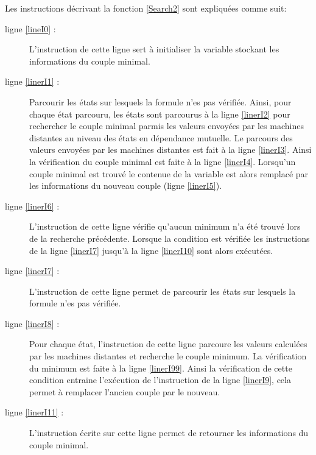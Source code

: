 Les instructions décrivant la fonction \ref{Search2} sont expliquées comme suit:
\begin{description}
	\item[ligne \ref{lineI0} :] L'instruction de cette ligne sert à initialiser la variable stockant les informations du couple minimal.
	\item[ligne \ref{linerI1} :] Parcourir les états \s{\border{}} sur lesquels la formule n'es pas vérifiée. Ainsi, pour chaque état parcouru, les états \s{\notifier} sont parcourus à la ligne \ref{linerI2} pour rechercher le couple minimal parmis les valeurs envoyées par les machines distantes au niveau des états en dépendance mutuelle. Le parcours des valeurs envoyées par les machines distantes est fait à la ligne \ref{linerI3}. Ainsi la vérification du couple minimal est faite  à la ligne \ref{linerI4}. Lorsqu'un couple minimal est trouvé le contenue de la variable  est alors remplacé par les informations du nouveau couple (ligne \ref{linerI5}).
	\item[ligne \ref{linerI6} :]  L'instruction de cette ligne vérifie qu'aucun minimum n'a été trouvé lors de la recherche précédente. Lorsque la condition est vérifiée les instructions de la ligne \ref{linerI7} jusqu'à la ligne \ref{linerI10} sont alors exécutées.
	\item[ligne \ref{linerI7} :] L'instruction de cette ligne permet de parcourir les états \s{\bn{}} sur lesquels la formule n'es pas vérifiée.
	\item[ligne \ref{linerI8} :]  Pour chaque état, l'instruction de cette ligne parcoure les valeurs calculées par les machines distantes et recherche le couple minimum. La vérification du minimum est faite à la ligne \ref{linerI99}. Ainsi la vérification de cette condition entraine l'exécution de l'instruction de la ligne \ref{linerI9}, cela permet à remplacer l'ancien couple par le nouveau.
	\item[ligne \ref{linerI11} :] L'instruction écrite sur cette ligne permet de retourner les informations du couple minimal.
\end{description}

